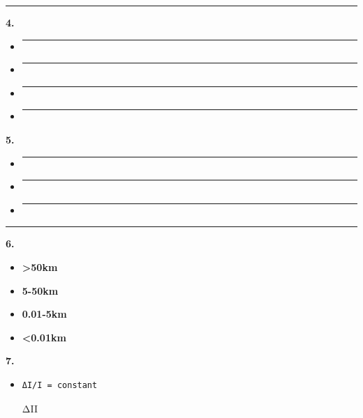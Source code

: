 \begin{center}\rule{0.5\linewidth}{0.5pt}\end{center}

\textbf{4. }

\begin{itemize}
\item
  \begin{center}\rule{0.5\linewidth}{0.5pt}\end{center}
\item
  \begin{center}\rule{0.5\linewidth}{0.5pt}\end{center}
\item
  \begin{center}\rule{0.5\linewidth}{0.5pt}\end{center}
\item
  \begin{center}\rule{0.5\linewidth}{0.5pt}\end{center}
\end{itemize}

\textbf{5. }

\begin{itemize}
\item
  \begin{center}\rule{0.5\linewidth}{0.5pt}\end{center}
\item
  \begin{center}\rule{0.5\linewidth}{0.5pt}\end{center}
\item
  \begin{center}\rule{0.5\linewidth}{0.5pt}\end{center}
\end{itemize}

\begin{center}\rule{0.5\linewidth}{0.5pt}\end{center}

\textbf{6. }

\begin{itemize}
\tightlist
\item
  \textbf{\textgreater50km}
\item
  \textbf{5-50km}
\item
  \textbf{0.01-5km}
\item
  \textbf{\textless0.01km}
\end{itemize}

\textbf{7. }

\begin{itemize}
\item
\begin{verbatim}
ΔI/I = constant
\end{verbatim}

  ΔII
\end{itemize}

